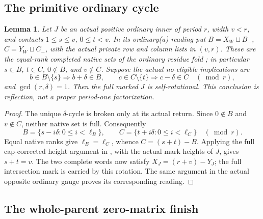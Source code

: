 \documentclass[11pt,a4paper]{amsart}
\numberwithin{equation}{section}
\theoremstyle{plain}
\newtheorem{lemma}[theorem]{Lemma}
\theoremstyle{definition}
\begin{document}
\subsection{The primitive ordinary cycle}

\begin{lemma}\label{ge:primitive-cycle}
Let \(J\) be an actual positive ordinary inner of period \(r\),
width \(v<r\), and contacts \(1\le s\le v\), \(0\le t<v\).
In its ordinary(a) reading put
\(B=X_W\sqcup B_-\), \(C=Y_W\sqcup C_-\), with the actual
private row and column lists in \((v,r)\).  These are the equal-rank
completed native sets of the ordinary residue fold
\cite[Ordinary residue fold]{Shields2026Gluing}; in particular
\(s\in B\), \(t\in C\), \(0\notin B\), and \(v\notin C\).
Suppose the actual no-eligible implications are
\[
 b\in B\setminus\{s\}\Longrightarrow b+\delta\in B,
 \qquad c\in C\setminus\{t\}\Longrightarrow c-\delta\in C
 \quad(\bmod r),
\]
and \(\gcd(r,\delta)=1\).  Then the full marked \(J\) is
self-rotational.  This conclusion is reflection, not a proper period-one
factorization.
\end{lemma}
\begin{proof}
The unique \(\delta\)-cycle is broken only at its actual return.
Since \(0\notin B\) and \(v\notin C\), neither native set is
full.  Consequently
\[
 B=\{s-i\delta:0\le i<\ell_B\},\qquad
 C=\{t+i\delta:0\le i<\ell_C\}\quad(\bmod r).
\]
Equal native ranks give \(\ell_B=\ell_C\), whence
\(C=(s+t)-B\).  Applying the full cap-corrected height argument in
, with the actual mark heights of \(J\),
gives \(s+t=v\).  The two complete words now satisfy
\(X_J=(r+v)-Y_J\); the full intersection mark is carried by this
rotation.  The same argument in the actual opposite ordinary gauge
proves its corresponding reading.
\end{proof}


\subsection{The whole-parent zero-matrix finish}
\end{document}
